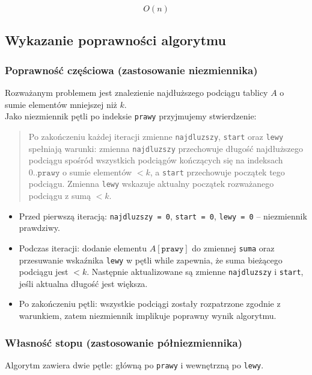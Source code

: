 \documentclass{article}
\begin{document}
\begin{equation}
    O(n)
\end{equation}

\subsection{Wykazanie poprawności algorytmu}
\subsubsection{Poprawność częściowa (zastosowanie niezmiennika)}
Rozważanym problemem jest znalezienie najdłuższego podciągu tablicy $A$ o sumie elementów mniejszej niż $k$. \\

Jako niezmiennik pętli po indeksie \texttt{prawy} przyjmujemy stwierdzenie:
\begin{quote}
Po zakończeniu każdej iteracji zmienne \texttt{najdluzszy}, \texttt{start} oraz \texttt{lewy} spełniają warunki: zmienna \texttt{najdluzszy} przechowuje długość najdłuższego podciągu spośród wszystkich podciągów kończących się na indeksach $0..\texttt{prawy}$ o sumie elementów $< k$, a \texttt{start} przechowuje początek tego podciągu. Zmienna \texttt{lewy} wskazuje aktualny początek rozważanego podciągu z sumą $< k$.
\end{quote}

\begin{itemize}
    \item Przed pierwszą iteracją: \texttt{najdluzszy = 0}, \texttt{start = 0}, \texttt{lewy = 0} – niezmiennik prawdziwy.
    \item Podczas iteracji: dodanie elementu $A[\texttt{prawy}]$ do zmiennej \texttt{suma} oraz przesuwanie wskaźnika \texttt{lewy} w pętli while zapewnia, że suma bieżącego podciągu jest $< k$. Następnie aktualizowane są zmienne \texttt{najdluzszy} i \texttt{start}, jeśli aktualna długość jest większa.
    \item Po zakończeniu pętli: wszystkie podciągi zostały rozpatrzone zgodnie z warunkiem, zatem niezmiennik implikuje poprawny wynik algorytmu.
\end{itemize}

\subsubsection{Własność stopu (zastosowanie półniezmiennika)}
Algorytm zawiera dwie pętle: główną po \texttt{prawy} i wewnętrzną po \texttt{lewy}.
\end{document}
